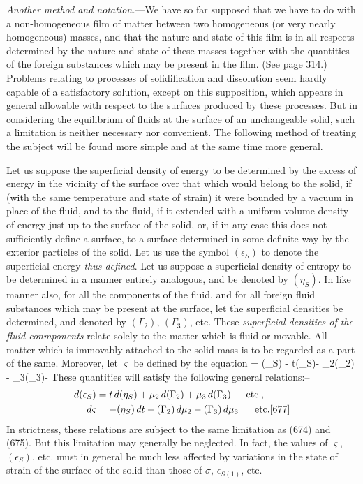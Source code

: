 \documentclass[12pt]{memoir}
\begin{document}
\textit{Another method and notation.}---We have so far supposed that we have to do with a non-homogeneous film of matter between two homogeneous (or very nearly homogeneous) masses, and that the nature and state of this film is in all respects determined by the nature and state of these masses together with the quantities of the foreign substances which may be present in the film. (See page 314.) Problems relating to processes of solidification and dissolution seem hardly capable of a satisfactory solution, except on this supposition, which appears in general allowable with respect to the surfaces produced by these processes. But in considering the equilibrium of fluids at the surface of an unchangeable solid, such a limitation is neither necessary nor convenient. The following method of treating the subject will be found more simple and at the same time more general.

Let us suppose the superficial density of energy to be determined by the excess of energy in the vicinity of the surface over that which would belong to the solid, if (with the same temperature and state of strain) it were bounded by a vacuum in place of the fluid, and to the fluid, if it extended with a uniform volume-density of energy just up to the surface of the solid, or, if in any case this does not sufficiently define a surface, to a surface determined in some definite way by the exterior particles of the solid. Let us use the symbol $(\epsilon_S)$ to denote the superficial energy \textit{thus defined}. Let us suppose a superficial density of entropy to be determined in a manner entirely analogous, and be denoted by $(\eta_S)$. In like manner also, for all the components of the fluid, and for all foreign fluid substances which may be present at the surface, let the superficial densities be determined, and denoted by $(\Gamma_2)$, $(\Gamma_3)$, etc. These \textit{superficial densities of the fluid conmponents} relate solely to the matter which is fluid or movable. All matter which is immovably attached to the solid mass is to be regarded as a part of the same. Moreover, let $\varsigma$ be defined by the equation
\eqs \varsigma = (\epsilon_S) - t(\eta_S)- \mu_2(\Gamma_2) - \mu_3(\Gamma_3)-     \label{676} \eqe
These quantities will satisfy the following general relations:--
\begin{align}
d(\epsilon_S) &= t\, d(\eta_S)+ \mu_2\, d (\Gamma_2) + \mu_3\, d (\Gamma_3) + \text{ etc.}, \label{677} \\
d \varsigma &= - (\eta_S)\, dt -(\Gamma_2)\, d \mu_2 -  (\Gamma_3)\, d \mu_3 = \text{ etc.}  \ref{677} \end{align}
In strictness, these relations are subject to the same limitation as (674) and (675). But this limitation may generally be neglected. In fact, the values of $\varsigma$, $(\epsilon_S)$, etc. must in general be much less affected by variations in the state of strain of the surface of the solid than those of $\sigma$, $\epsilon_{S(1)}$, etc.
\end{document}
